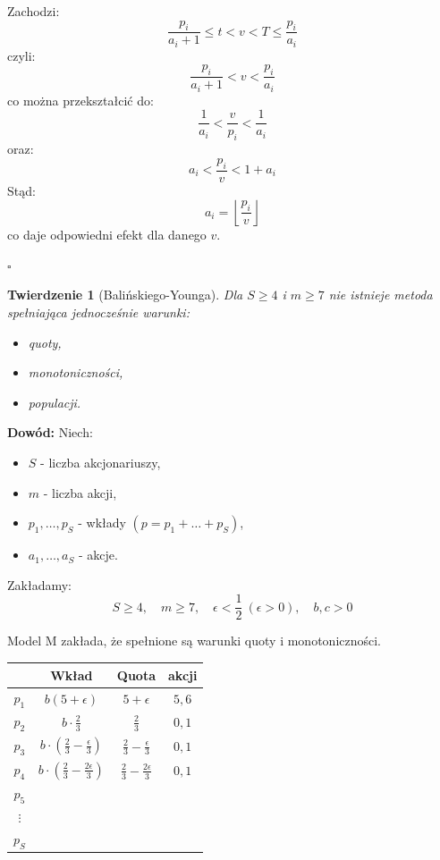 \documentclass[12pt,a4paper]{article}
\theoremstyle{break}
\newtheorem{theorem}{Twierdzenie}[section]
\begin{document}
	Zachodzi:
	\[
	\frac{p_i}{a_i + 1} \leq t < v < T \leq \frac{p_i}{a_i}
	\]
	czyli:
	\[
	\frac{p_i}{a_i + 1} < v < \frac{p_i}{a_i}
	\]
	co można przekształcić do:
	\[
	\frac{1}{a_i} < \frac{v}{p_i} < \frac{1}{a_i}
	\]
	oraz:
	\[
	a_i < \frac{p_i}{v} < 1 + a_i
	\]
	Stąd:
	\[
	a_i = \left\lfloor \frac{p_i}{v} \right\rfloor
	\]
	co daje odpowiedni efekt dla danego $v$.
	
	\begin{flushright}
		$\square$
	\end{flushright}

	\begin{theorem}[Balińskiego-Younga]
	Dla $S \geq 4$ i $m \geq 7$ nie istnieje metoda spełniająca jednocześnie warunki:
	\begin{itemize}
		\item quoty,
		\item monotoniczności,
		\item populacji.
	\end{itemize}
	\end{theorem}
	
	\noindent \textbf{Dowód:} Niech:
	\begin{itemize}
		\item $S$ - liczba akcjonariuszy,
		\item $m$ - liczba akcji,
		\item $p_1, \dots, p_S$ - wkłady $(p = p_1 + \dots + p_S)$,
		\item $a_1, \dots, a_S$ - akcje.
	\end{itemize}
	
	Zakładamy:
	\[
	S \geq 4, \quad m \geq 7, \quad \epsilon < \frac{1}{2} \ (\epsilon > 0), \quad b, c > 0
	\]
	
	Model M zakłada, że spełnione są warunki quoty i monotoniczności.
	
	\begin{tabular}{c|c|c|c}
		& Wkład & Quota & akcji \\ \hline
		$p_1$ & $b(5 + \epsilon)$ & $5 + \epsilon$ & $5, 6$ \\ \hline
		$p_2$ & $b \cdot \frac{2}{3}$ & $\frac{2}{3}$ & $0, 1$ \\ \hline
		$p_3$ & $b \cdot \left(\frac{2}{3} - \frac{\epsilon}{3}\right)$ & $\frac{2}{3} - \frac{\epsilon}{3}$ & $0, 1$ \\ \hline
		$p_4$ & $b \cdot \left(\frac{2}{3} - \frac{2\epsilon}{3}\right)$ & $\frac{2}{3} - \frac{2\epsilon}{3}$ & $0, 1$ \\ \hline
		$p_5$ & & & \\ \hline
		$\vdots$ & & & \\ \hline
		$p_S$ & & & \\ \hline
	\end{tabular}
	
\end{document}
